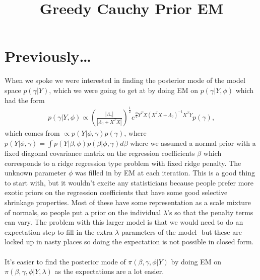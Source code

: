 \documentclass[6pt]{article}
\begin{document}

\vspace{-1in}
\title{\bf Greedy Cauchy Prior EM}
\maketitle \centerline{{\color{RoyalBlue2}{Michael Lindon}}}\bigskip
\section{Previously\dots}
When we spoke we were interested in finding the posterior mode of the model space $p(\gamma|Y)$, which we were going to get at by doing EM on $p(\gamma|Y,\phi)$ which had the form 
\begin{align*}
	p(\gamma|Y,\phi)\propto \left( \frac{|\Lambda_{\gamma}|}{|\Lambda_{\gamma}+X^{T}X|}\right)^{\frac{1}{2}}e^{\frac{\phi}{2}Y^{T}X(X^{T}X+\Lambda_{\gamma})^{-1}X^{T}Y}p(\gamma),
\end{align*}
which comes from $\propto p(Y|\phi,\gamma) p(\gamma)$, where $p(Y|\phi,\gamma)=\int p(Y|\beta,\phi)p(\beta|\phi,\gamma)d\beta$ where we assumed a normal prior with a fixed diagonal covariance matrix on the regression coefficients $\beta$ which corresponds to a ridge regression type problem with fixed ridge penalty. The unknown parameter $\phi$ was filled in by EM at each iteration. This is a good thing to start with, but it wouldn't excite any statisticians because people prefer more exotic priors on the regression coefficients that have some good selective shrinkage properties. Most of these have some representation as a scale mixture of normals, so people put a prior on the individual $\lambda$'s so that the penalty terms can vary. The problem with this larger model is that we would need to do an expectation step to fill in the extra $\lambda$ parameters of the model- but these are locked up in nasty places so doing the expectation is not possible in closed form. \\
\\
It's easier to find the posterior mode of $\pi(\beta,\gamma,\phi|Y)$ by doing EM on $\pi(\beta,\gamma,\phi|Y,\lambda)$ as the expectations are a lot easier.\\
\end{document}
